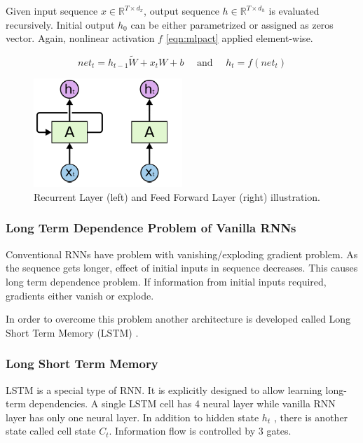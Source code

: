Given input sequence $x \in \mathbb{R}^{T \times d_x}$, output sequence $h \in \mathbb{R}^{T \times d_h}$ is evaluated recursively. Initial output $h_0$ can be either parametrized or assigned as zeros vector. Again, nonlinear activation $f$ \ref{eqn:mlpact} applied element-wise. 

\begin{equation}
\label{eqn:rnnact}
net_t = h_{t-1} \tilde{W} + x_t W + b \quad \text{ and }\quad  h_t = f(net_t)
\end{equation}


\begin{figure}
	\centering
	\includegraphics[width=0.5\textwidth]{figures/ml_theory/rnn_vs_ffnn_layer.png}
	\caption{Recurrent Layer (left) and Feed Forward Layer (right) illustration.}
	\label{fig:rnn_vs_ffnn}
\end{figure}

\subsubsection{Long Term Dependence Problem of Vanilla RNNs}


Conventional RNNs have problem with vanishing/exploding gradient problem.  As the sequence gets longer, effect of initial inputs in sequence decreases. This causes long term dependence problem. If information from initial inputs required, gradients either vanish or explode. 

In order to overcome this problem another architecture is developed called Long Short Term Memory (LSTM) \cite{hochreiter_long_1997}.

\subsubsection{Long Short Term Memory}
LSTM is a special type of RNN. It is explicitly designed to allow learning long-term dependencies. A single LSTM cell has 4 neural layer while vanilla RNN layer has only one neural layer. In addition to hidden state $h_t$ , there is another state called cell state $C_t$. Information flow is controlled by 3 gates. 

